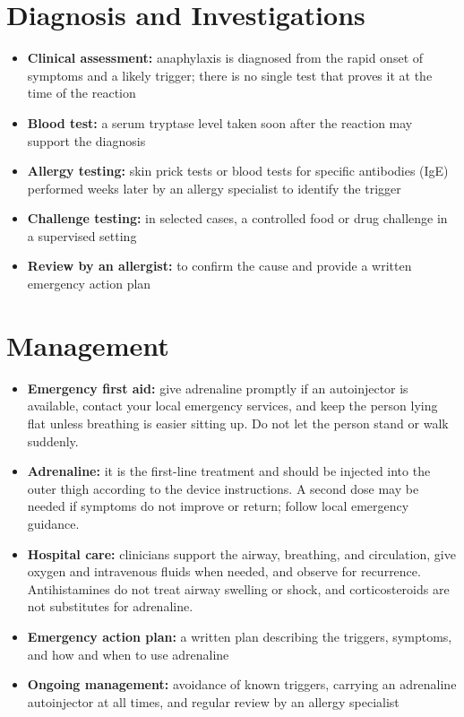 \section*{Diagnosis and Investigations}
\begin{itemize}
    \item \textbf{Clinical assessment:} anaphylaxis is diagnosed from the rapid onset of symptoms and a likely trigger; there is no single test that proves it at the time of the reaction
    \item \textbf{Blood test:} a serum tryptase level taken soon after the reaction may support the diagnosis
    \item \textbf{Allergy testing:} skin prick tests or blood tests for specific antibodies (IgE) performed weeks later by an allergy specialist to identify the trigger
    \item \textbf{Challenge testing:} in selected cases, a controlled food or drug challenge in a supervised setting
    \item \textbf{Review by an allergist:} to confirm the cause and provide a written emergency action plan
\end{itemize}

\section*{Management}
\begin{itemize}
    \item \textbf{Emergency first aid:} give adrenaline promptly if an autoinjector is available, contact your local emergency services, and keep the person lying flat unless breathing is easier sitting up. Do not let the person stand or walk suddenly.
    \item \textbf{Adrenaline:} it is the first-line treatment and should be injected into the outer thigh according to the device instructions. A second dose may be needed if symptoms do not improve or return; follow local emergency guidance.
    \item \textbf{Hospital care:} clinicians support the airway, breathing, and circulation, give oxygen and intravenous fluids when needed, and observe for recurrence. Antihistamines do not treat airway swelling or shock, and corticosteroids are not substitutes for adrenaline.
    \item \textbf{Emergency action plan:} a written plan describing the triggers, symptoms, and how and when to use adrenaline
    \item \textbf{Ongoing management:} avoidance of known triggers, carrying an adrenaline autoinjector at all times, and regular review by an allergy specialist
\end{itemize}

